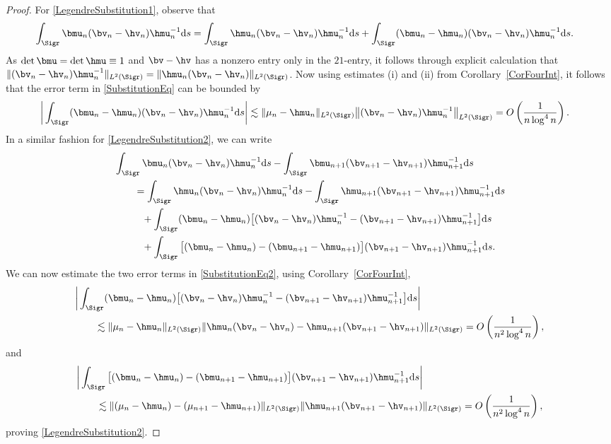 \begin{proof}
For \eqref{LegendreSubstitution1}, observe that
\begin{align} \label{SubstitutionEq}
 \int_{\Sigr} \bmu_n&(\bv_n-\hv_n)\hmu_n^{-1} {\rm d}s
= \int_{\Sigr} \hmu_n(\bv_n-\hv_n)\hmu_n^{-1} {\rm d}s + \int_{\Sigr} (\bmu_n-\hmu_n)(\bv_n-\hv_n)\hmu_n^{-1} {\rm d}s.
\end{align}
As $\det \bmu = \det \hmu \equiv 1$ and $\bv-\hv$ has a nonzero entry only in the $21$-entry, it follows through explicit calculation that $\Vert (\bv_n - \hv_n)\hmu_n^{-1} \Vert_{L^2(\Sigr)} =\Vert \hmu_n (\bv_n - \hv_n) \Vert_{L^2(\Sigr)}$.
Now using estimates (i) and (ii) from Corollary~\ref{CorFourInt}, it follows that the error term in \eqref{SubstitutionEq} can be bounded by
\begin{align*}
 &\bigg| \int_{\Sigr}(\bmu_n-\hmu_n)(\bv_n-\hv_n)\hmu_n^{-1} {\rm d}s\bigg|\lesssim \Vert \mu_n - \hmu_n \Vert_{L^2(\Sigr)} \big\Vert (\bv_n - \hv_n)\hmu_n^{-1} \big\Vert_{L^2(\Sigr)} = O\left(\frac{1}{n\log^4 n}\right).
\end{align*}
In a similar fashion for \eqref{LegendreSubstitution2}, we can write
\begin{align}
 &\int_{\Sigr} \bmu_n(\bv_n-\hv_n)\hmu^{-1}_n {\rm d}s - \int_{\Sigr} \bmu_{n+1}(\bv_{n+1}-\hv_{n+1})\hmu^{-1}_{n+1} {\rm d}s\nonumber
 \\
 &\qquad=\int_{\Sigr} \hmu_n(\bv_n-\hv_n)\hmu^{-1}_n {\rm d}s - \int_{\Sigr} \hmu_{n+1}(\bv_{n+1}-\hv_{n+1})\hmu^{-1}_{n+1} {\rm d}s\nonumber
 \\
 &\qquad\phantom{=}{}+ \int_{\Sigr} (\bmu_n-\hmu_n)\big[(\bv_n-\hv_n)\hmu^{-1}_n-(\bv_{n+1}-\hv_{n+1})\hmu^{-1}_{n+1}\big] {\rm d}s\nonumber
 \\
 &\qquad\phantom{=}{}+ \int_{\Sigr} \big[(\bmu_n-\hmu_n)-(\bmu_{n+1}-\hmu_{n+1})\big](\bv_{n+1}-\hv_{n+1})\hmu^{-1}_{n+1} {\rm d}s.\label{SubstitutionEq2}
\end{align}
We can now estimate the two error terms in \eqref{SubstitutionEq2}, using Corollary~\ref{CorFourInt},
\begin{align*}
 &\bigg|\int_{\Sigr} (\bmu_n-\hmu_n)\big[(\bv_n-\hv_n)\hmu^{-1}_n-(\bv_{n+1}-\hv_{n+1})\hmu^{-1}_{n+1}\big] {\rm d}s\bigg|
 \\
 &\qquad\lesssim \Vert \mu_n - \hmu_n \Vert_{L^2(\Sigr)} \Vert \hmu_n (\bv_n - \hv_n) - \hmu_{n+1} (\bv_{n+1} - \hv_{n+1}) \Vert_{L^2(\Sigr)} = O\left(\frac{1}{n^{2}\log^4 n}\right),
\end{align*}
and
\begin{align*}
 &\bigg| \int_{\Sigr} \big[(\bmu_n-\hmu_n)-(\bmu_{n+1}-\hmu_{n+1})\big](\bv_{n+1}-\hv_{n+1})\hmu^{-1}_{n+1} {\rm d}s \bigg|
 \\
 &\qquad\lesssim \Vert (\mu_n - \hmu_n) - (\mu_{n+1} - \hmu_{n+1}) \Vert_{L^2(\Sigr)} \Vert \hmu_{n+1} (\bv_{n+1} - \hv_{n+1}) \Vert_{L^2(\Sigr)} = O\left(\frac{1}{n^{2}\log^4 n}\right),
\end{align*}
proving \eqref{LegendreSubstitution2}.
\end{proof}

